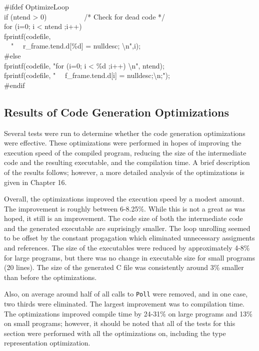 \goodbreak
\begin{iconcode}
\#ifdef OptimizeLoop\\
if (ntend > 0) \ \ \ \ \ \ \ \ \ \ /* Check for dead code */\\
\>for (i=0; i < ntend ;i++)\\
\>\>fprintf(codefile,\\
\>\>\>\>\ \ " \ \ r\_frame.tend.d[\%d] = nulldesc; {\textbackslash}n",i);\\
\#else\\
fprintf(codefile, "for (i=0; i < \%d ;i++) {\textbackslash}n", ntend);\\
fprintf(codefile, " \ \ f\_frame.tend.d[i] = nulldesc;{\textbackslash}n;");\\
\#endif\\
\end{iconcode}

\subsection{Results of Code Generation Optimizations}

Several tests were run to determine whether the code generation
optimizations were effective. These optimizations were performed in
hopes of improving the execution speed of the compiled program,
reducing the size of the intermediate code and the resulting
executable, and the compilation time. A brief description of the
results follows; however, a more detailed analysis of the
optimizations is given in Chapter 16.


Overall, the optimizations improved the execution speed by a modest
amount. The improvement is roughly between 6-8.25\%.  While this is
not a great as was hoped, it still is an improvement. The code size of
both the intermediate code and the generated executable are
suprisingly smaller. The loop unrolling seemed to be offset by the
constant progagation which eliminated unnecessary assigments and
references. The size of the executables were reduced by approximately
4-8\% for large programs, but there was no change in executable size
for small programs (20 lines). The size of the generated C file was
consistently around 3\% smaller than before the optimizations.


Also, on average around half of all calls to \texttt{Poll} were
removed, and in one case, two thirds were eliminated.  The largest
improvement was to compilation time. The optimizations improved
compile time by 24-31\% on large programs and 13\% on small programs;
however, it should be noted that all of the tests for this section
were performed with all the optimizations on, including the type
representation optimization.

